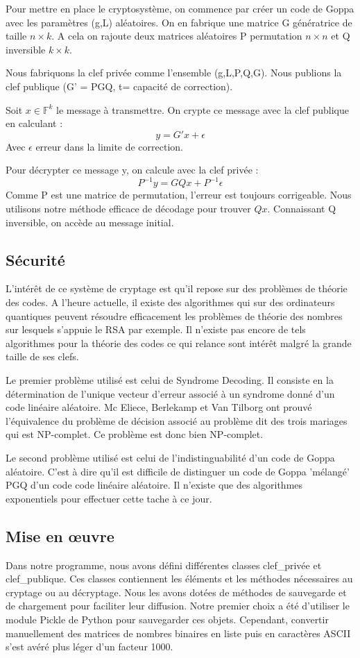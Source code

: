 \documentclass{article}
\begin{document}
			Pour mettre en place le cryptosystème, on commence par créer un code de Goppa avec les paramètres (g,L) aléatoires.
			On en fabrique une matrice G génératrice de taille $n\times k$.
			A cela on rajoute deux matrices aléatoires P permutation $n\times n$ et Q inversible $k \times k$.

			Nous fabriquons la clef privée comme l'ensemble (g,L,P,Q,G).
			Nous publions la clef publique (G' = PGQ, t= capacité de correction).

			Soit $x\in \mathbb{F}^{k}$ le message à transmettre.
			On crypte ce message avec la clef publique en calculant :
			$$
				y = G'x + \epsilon
			$$
			Avec $\epsilon$ erreur dans la limite de correction.

			Pour décrypter ce message y, on calcule avec la clef privée :
			$$
				P^{-1}y = GQx + P^{-1}\epsilon
			$$
			Comme P est une matrice de permutation, l'erreur est toujours corrigeable.
			Nous utilisons notre méthode efficace de décodage pour trouver $Qx$.
			Connaissant Q inversible, on accède au message initial.


		\subsection*{Sécurité}
			 L'intérêt de ce système de cryptage est qu'il repose sur des problèmes de théorie des codes.
			 A l'heure actuelle, il existe des algorithmes qui sur des ordinateurs quantiques peuvent résoudre efficacement les problèmes de théorie des nombres sur lesquels s’appuie le RSA par exemple.
			 Il n'existe pas encore de tels algorithmes pour la théorie des codes ce qui relance sont intérêt malgré la grande taille de ses clefs.

			 Le premier problème utilisé est celui de Syndrome Decoding.
			 Il consiste en la détermination de l'unique vecteur d'erreur associé à un syndrome donné d'un code linéaire aléatoire.
			 Mc Eliece, Berlekamp et Van Tilborg ont prouvé l'équivalence du problème de décision associé au problème dit des trois mariages qui est NP-complet.
			 Ce problème est donc bien NP-complet.

			 Le second problème utilisé est celui de l'indistinguabilité d'un code de Goppa aléatoire.
			 C'est à dire qu'il est difficile de distinguer un code de Goppa 'mélangé' PGQ d'un code code linéaire aléatoire.
			 Il n'existe que des algorithmes exponentiels pour effectuer cette tache à ce jour.

		\subsection*{Mise en œuvre}
			Dans notre programme, nous avons défini différentes classes clef\_privée et clef\_publique.
			Ces classes contiennent les éléments et les méthodes nécessaires au cryptage ou au décryptage.
			Nous les avons dotées de méthodes de sauvegarde et de chargement pour faciliter leur diffusion.
			Notre premier choix a été d'utiliser le module Pickle de Python pour sauvegarder ces objets.
			Cependant, convertir manuellement des matrices de nombres binaires en liste puis en caractères ASCII s'est avéré plus léger d'un facteur 1000.
\end{document}

